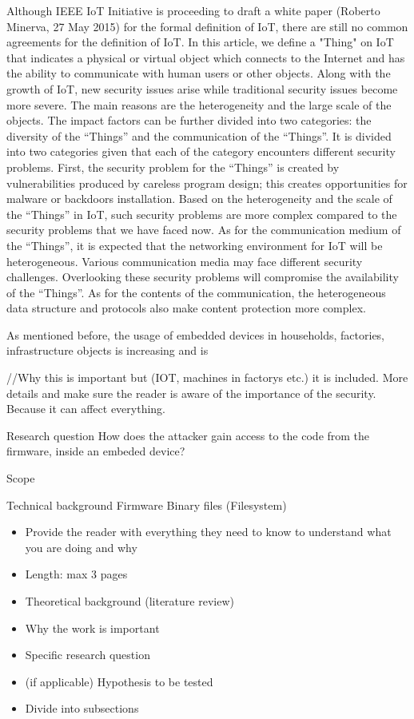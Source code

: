 \documentclass[]{report}
\begin{document}
{Although IEEE IoT Initiative is proceeding to draft a white
paper (Roberto Minerva, 27 May 2015) for the formal definition of IoT, there are still no
common agreements for the definition of IoT. In this article,
we define a "Thing" on IoT that indicates a physical or
virtual object which connects to the Internet and has the
ability to communicate with human users or other objects.
Along with the growth of IoT, new security issues arise
while traditional security issues become more severe. The
main reasons are the heterogeneity and the large scale of the
objects. The impact factors can be further divided into two
categories: the diversity of the “Things” and the
communication of the “Things”. It is divided into two
categories given that each of the category encounters
different security problems.
First, the security problem for the “Things” is created by
vulnerabilities produced by careless program design; this
creates opportunities for malware or backdoors installation.
Based on the heterogeneity and the scale of the “Things” in
IoT, such security problems are more complex compared to
the security problems that we have faced now.
As for the communication medium of the “Things”, it is
expected that the networking environment for IoT will be
heterogeneous. Various communication media may face
different security challenges. Overlooking these security
problems will compromise the availability of the “Things”.
As for the contents of the communication, the heterogeneous
data structure and protocols also make content protection more complex.

As mentioned before, the usage of embedded devices in households, factories, infrastructure objects is increasing and is 

//Why this is important but (IOT, machines in factorys etc.) it is included. More details and make sure the reader is aware of the importance of the security. Because it can affect everything.
}

Research question
How does the attacker gain access to the code from the firmware, inside an embeded device?

Scope

Technical background
Firmware
Binary files (Filesystem)

\begin{itemize}
	\item Provide the reader with everything they need to know to understand what you are doing and why

	\item Length: max 3 pages
	\item Theoretical background (literature review)
	\item Why the work is important
	\item Specific research question
	\item (if applicable) Hypothesis to be tested
	\item Divide into subsections
\end{itemize}
\end{document}
